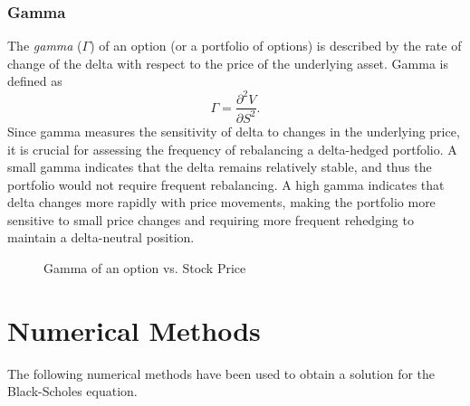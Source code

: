\subsubsection{Gamma}
The \textit{gamma} ($\Gamma$) of an option (or a portfolio of options) is described by the rate of change of the delta with respect to the price of the underlying asset. Gamma is defined as
\begin{equation}
    \Gamma = \frac{\partial^2 V}{\partial S^2}.
\end{equation}
Since gamma measures the sensitivity of delta to changes in the underlying price, it is crucial for assessing the frequency of rebalancing a delta-hedged portfolio. A small gamma indicates
that the delta remains relatively stable, and thus the portfolio would not require frequent rebalancing. A high gamma indicates that delta changes more rapidly with price movements, making the portfolio more sensitive to small price changes and requiring more frequent rehedging to maintain a delta-neutral position.

\begin{figure}[H]
    \centering
    \caption{Gamma of an option vs. Stock Price}
    \label{fig:gamma-plot}
\end{figure}


\section{Numerical Methods}\label{sec:numerical-methods}
The following numerical methods have been used to obtain a solution for the Black-Scholes equation.

